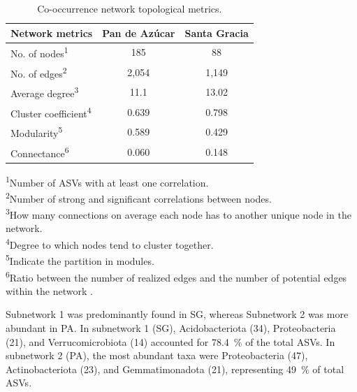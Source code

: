 \begin{table}[ht]
	\centering
	\caption[Co-occurrence network topological metrics]{Co-occurrence network topological metrics.}
	\label{tab:M3-T1}
	\begin{tabular}{lcc}
	\hline
	\textbf{Network metrics} & \textbf{Pan de Azúcar} & \textbf{Santa Gracia} \\
	\hline
	No. of nodes\textsuperscript{1} & 185 & 88 \\
	No. of edges\textsuperscript{2} & 2,054 & 1,149 \\
	Average degree\textsuperscript{3} & 11.1 & 13.02 \\
	Cluster coefficient\textsuperscript{4} & 0.639 & 0.798 \\
	Modularity\textsuperscript{5} & 0.589 & 0.429 \\
	Connectance\textsuperscript{6} & 0.060 & 0.148 \\
	\hline
	\end{tabular}
	
	\vspace{0.5em}
	\begin{minipage}{0.9\textwidth}
	\footnotesize
	\textsuperscript{1}Number of ASVs with at least one correlation.\\
	\textsuperscript{2}Number of strong and significant correlations between nodes.\\
	\textsuperscript{3}How many connections on average each node has to another unique node in the network.\\
	\textsuperscript{4}Degree to which nodes tend to cluster together.\\
	\textsuperscript{5}Indicate the partition in modules.\\
	\textsuperscript{6}Ratio between the number of realized edges and the number of potential edges within the network \citep{DiniAndreote2014, Karimi2017}.
	\end{minipage}
	\end{table}
	
	

Subnetwork 1 was predominantly found in SG, whereas Subnetwork 2 was more abundant in PA. In subnetwork 1 (SG), Acidobacteriota (34), Proteobacteria (21), and Verrucomicrobiota (14) accounted for \SI{78.4}{\percent} of the total ASVs. In subnetwork 2 (PA), the most abundant taxa were Proteobacteria (47), Actinobacteriota (23), and Gemmatimonadota (21), representing \SI{49}{\percent} of total ASVs.

